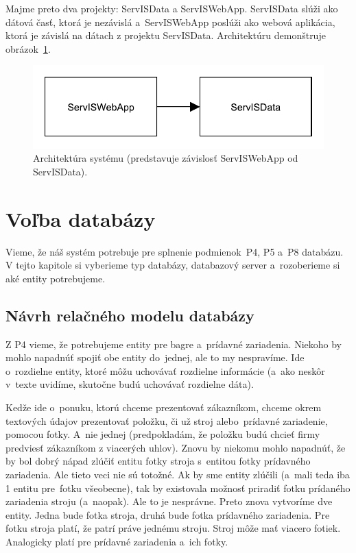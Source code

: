 Majme preto dva projekty: ServISData a ServISWebApp. ServISData slúži ako dátová časť, ktorá je nezávislá a~ServISWebApp poslúži ako webová aplikácia, ktorá je závislá na dátach z projektu ServISData. Architektúru demonštruje obrázok~\ref{architektura systemu}.

\begin{figure}[H]\centering
\includegraphics[width=140mm]{../img/architektura systemu}
\caption{Architektúra systému (predstavuje závislosť ServISWebApp od ServISData).}
\label{architektura systemu}
\end{figure}

\section{Voľba databázy}

Vieme, že náš systém potrebuje pre splnenie podmienok~P4, P5 a~P8 databázu. V tejto kapitole si vyberieme typ databázy, databazový server a~rozoberieme si aké entity potrebujeme.

\subsection{Návrh relačného modelu databázy}

Z P4 vieme, že potrebujeme entity pre bagre a~prídavné zariadenia. Niekoho by mohlo napadnúť spojiť obe entity do~jednej, ale to my nespravíme. Ide o~rozdielne entity, ktoré môžu uchovávať rozdielne informácie (a~ako neskôr v~texte uvidíme, skutočne budú uchovávať rozdielne dáta).

Kedže ide o~ponuku, ktorú chceme prezentovať zákazníkom, chceme okrem textových údajov prezentovať položku, či už stroj alebo~prídavné zariadenie, pomocou fotky. A~nie jednej (predpokladám, že položku budú chcieť firmy predviesť zákazníkom z viacerých uhlov). Znovu by niekomu mohlo napadnúť, že by bol dobrý nápad zlúčiť entitu fotky stroja s~entitou fotky prídavného zariadenia. Ale tieto veci nie sú totožné. Ak by sme entity zlúčili (a~mali teda iba 1 entitu pre~fotku všeobecne), tak by existovala možnosť priradiť fotku prídaného zariadenia stroju (a~naopak). Ale to je nesprávne. Preto znova vytvoríme dve entity. Jedna bude fotka stroja, druhá bude fotka prídavného zariadenia. Pre fotku stroja platí, že patrí práve jednému stroju. Stroj môže mať viacero fotiek. Analogicky platí pre prídavné zariadenia a~ich fotky.


